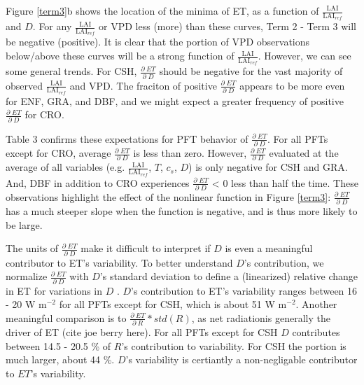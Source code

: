 \documentclass[draft,linenumbers]{agujournal}
\begin{document}
Figure \ref{term3}b shows the location of the minima of ET, as a function of $\frac{\text{LAI}}{\text{LAI$_{ref}$}}$ and $D$. For any $\frac{\text{LAI}}{\text{LAI$_{ref}$}}$ or VPD less (more) than these curves, Term 2 - Term 3 will be negative (positive). It is clear that the portion of VPD observations below/above these curves will be a strong function of $\frac{\text{LAI}}{\text{LAI$_{ref}$}}$. However, we can see some general trends. For CSH, $\frac{\partial \; ET}{\partial \; D}$ should be negative for the vast majority of observed $\frac{\text{LAI}}{\text{LAI$_{ref}$}}$ and VPD. The fraciton of positive $\frac{\partial \; ET}{\partial \; D}$ appears to be more even for ENF, GRA, and DBF, and we might expect a greater frequency of positive $\frac{\partial \; ET}{\partial \; D}$ for CRO. 

Table 3 confirms these expectations for PFT behavior of $\frac{\partial \; ET}{\partial \; D}$. For all PFTs except for CRO, average $\frac{\partial \; ET}{\partial \; D}$ is less than zero. However, $\frac{\partial \; ET}{\partial \; D}$ evaluated at the average of all variables (e.g. $\frac{\text{LAI}}{\text{LAI$_{ref}$}}$, $T$, $c_s$, $D$) is only negative for CSH and GRA. And, DBF in addition to CRO experiences $\frac{\partial \; ET}{\partial \; D}$ < 0 less than half the time. These observations highlight the effect of the nonlinear function in Figure \ref{term3}: $\frac{\partial \; ET}{\partial \; D}$ has a much steeper slope when the function is negative, and is thus more likely to be large.

The units of $\frac{\partial \; ET}{\partial \; D}$ make it difficult to interpret if $D$ is even a meaningful contributor to ET's variability. To better understand $D$'s contribution, we normalize $\frac{\partial \; ET}{\partial \; D}$ with $D$'s standard deviation to define a (linearized) relative change in ET for variations in $D$ . $D$'s contribution to ET's variability ranges between 16 - 20 W m$^{-2}$ for all PFTs except for CSH, which is about 51 W m$^{-2}$. Another meaningful comparison is to $\frac{\partial \; ET}{\partial \; R} * std(R)$, as net radiationis generally the driver of ET (cite joe berry here). For all PFTs except for CSH $D$ contributes between 14.5 - 20.5 \% of $R$'s contribution to variability. For CSH the portion is much larger, about 44 \%. $D$'s variability is certiantly a non-negligable contributor to $ET$'s variability.
\end{document}
